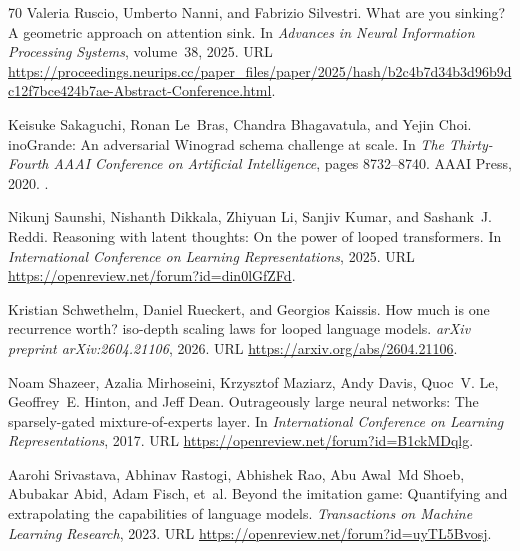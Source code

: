 \documentclass[]{bytedance_seed}
\theoremstyle{definition}
\theoremstyle{remark}
\begin{document}
\begin{thebibliography}{70}
Valeria Ruscio, Umberto Nanni, and Fabrizio Silvestri.
\newblock What are you sinking? {A} geometric approach on attention sink.
\newblock In \emph{Advances in Neural Information Processing Systems},
  volume~38, 2025.
\newblock URL
  \url{https://proceedings.neurips.cc/paper_files/paper/2025/hash/b2c4b7d34b3d96b9dc12f7bce424b7ae-Abstract-Conference.html}.

Keisuke Sakaguchi, Ronan Le~Bras, Chandra Bhagavatula, and Yejin Choi.
ino{G}rande: An adversarial {W}inograd schema challenge at scale.
\newblock In \emph{The Thirty-Fourth AAAI Conference on Artificial
  Intelligence}, pages 8732--8740. {AAAI} Press, 2020.
\newblock {}.

Nikunj Saunshi, Nishanth Dikkala, Zhiyuan Li, Sanjiv Kumar, and Sashank~J.
  Reddi.
\newblock Reasoning with latent thoughts: On the power of looped transformers.
\newblock In \emph{International Conference on Learning Representations}, 2025.
\newblock URL \url{https://openreview.net/forum?id=din0lGfZFd}.

Kristian Schwethelm, Daniel Rueckert, and Georgios Kaissis.
\newblock How much is one recurrence worth? iso-depth scaling laws for looped
  language models.
\newblock \emph{arXiv preprint arXiv:2604.21106}, 2026.
\newblock URL \url{https://arxiv.org/abs/2604.21106}.

Noam Shazeer, Azalia Mirhoseini, Krzysztof Maziarz, Andy Davis, Quoc~V. Le,
  Geoffrey~E. Hinton, and Jeff Dean.
\newblock Outrageously large neural networks: The sparsely-gated
  mixture-of-experts layer.
\newblock In \emph{International Conference on Learning Representations}, 2017.
\newblock URL \url{https://openreview.net/forum?id=B1ckMDqlg}.

Aarohi Srivastava, Abhinav Rastogi, Abhishek Rao, Abu Awal~Md Shoeb, Abubakar
  Abid, Adam Fisch, et~al.
\newblock Beyond the imitation game: Quantifying and extrapolating the
  capabilities of language models.
\newblock \emph{Transactions on Machine Learning Research}, 2023.
\newblock URL \url{https://openreview.net/forum?id=uyTL5Bvosj}.


\end{thebibliography}
\end{document}
